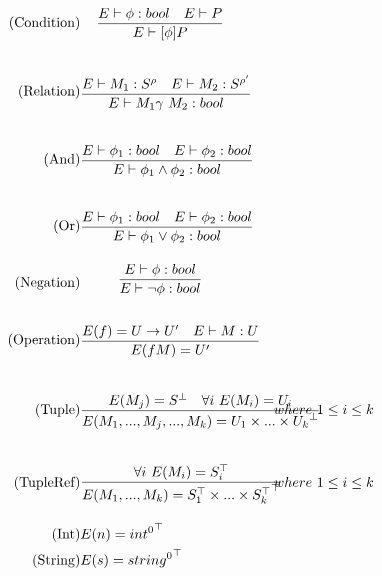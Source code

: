 \begin{align*}
\tag{Condition} &\infrule{E\vdash \phi:bool\quad E\vdash P}{E \vdash [\phi] P}\\
\tag{Relation} &\infrule{E\vdash M_1:S^\rho \quad E\vdash M_2:S^{\rho'}}{E\vdash M_1 \gamma\ M_2:bool}\\
\tag{And} &\infrule{E\vdash \phi _1:bool \quad E\vdash \phi _2:bool}{E\vdash \phi _1 \land \phi _2:bool}\\
\tag{Or} &\infrule{E\vdash \phi _1:bool \quad E\vdash \phi _2:bool}{E\vdash \phi _1 \lor \phi _2:bool}\\
\tag{Negation} &\infrule{E\vdash \phi :bool }{E\vdash \neg \phi :bool}\\
\tag{Operation} &\infrule{E(f)=U\ra U'\quad E\vdash M:U}{E(fM)=U'}\\
\tag{Tuple} &\infrule{E(M_j)=S^\bot\quad\forall i\ E(M_i) = U_i}{E(M_1,...,M_j,...,M_k)={U_1\times...\times U_k}^\bot}& where\ 1\leq i\leq k\\
\tag{TupleRef} &\infrule{\forall i\ E(M_i) = S_i^\top}{E(M_1,...,M_k)={S_1^\top\times...\times S_k^\top}^\top}& where\ 1\leq i\leq k\\
\tag{Int} &E(n)={int^0}^\top\\
\tag{String} &E(s)={string^0}^\top\\
\end{align*}




